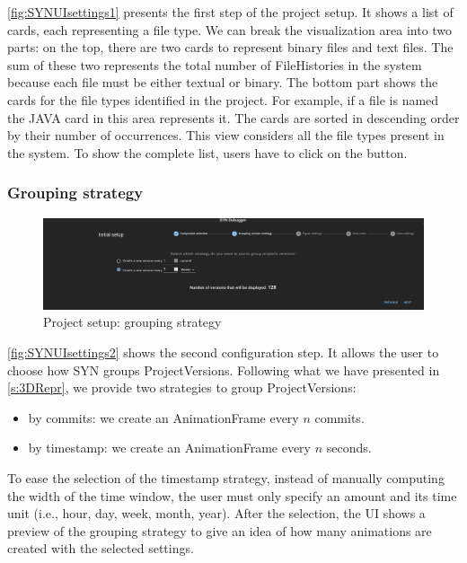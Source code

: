 \autoref{fig:SYNUIsettings1} presents the first step of the project setup. It shows a list of cards, each representing a file type. 
We can break the visualization area into two parts: on the top, there are two cards to represent binary files and text files. 
The sum of these two represents the total number of FileHistories in the system because each file must be either textual or binary. 
The bottom part shows the cards for the file types identified in the project. For example, if a file is named  the JAVA card in this area represents it. 
The cards are sorted in descending order by their number of occurrences. This view considers all the file types present in the system. To show the complete list, users have to click on the  button.

\subsubsection{Grouping strategy}

\begin{figure} [h]
    \center
    \includegraphics[width=\textwidth]{SYNUI-settings2.png}
    \caption{Project setup: grouping strategy}
    \label{fig:SYNUIsettings2}
\end{figure}

\autoref{fig:SYNUIsettings2} shows the second configuration step. It allows the user to choose how SYN groups ProjectVersions. 
Following what we have presented in \autoref{s:3DRepr}, we provide two strategies to group ProjectVersions:
\begin{itemize}
    \item by commits: we create an AnimationFrame every $n$ commits. 
    \item by timestamp: we create an AnimationFrame every $n$ seconds. 
\end{itemize}

To ease the selection of the timestamp strategy, instead of manually computing the width of the time window, the user must only specify an amount and its time unit (i.e., hour, day, week, month, year). After the selection, the UI shows a preview of the grouping strategy to give an idea of how many animations are created with the selected settings. 


